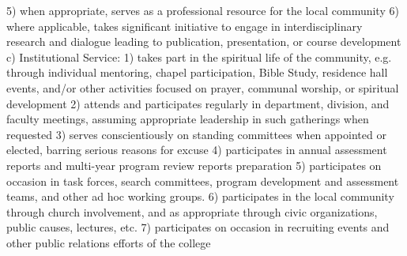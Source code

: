 \documentclass[letterpaper, 11pt]{article}
\begin{document}
5) when appropriate, serves as a professional resource for the local community
6) where applicable, takes significant initiative to engage in interdisciplinary research and dialogue leading to publication, presentation, or course development
c) Institutional Service:
1) takes part in the spiritual life of the community, e.g. through individual mentoring, chapel participation, Bible Study, residence hall events, and/or other activities focused on prayer, communal worship, or spiritual development
2) attends and participates regularly in department, division, and faculty meetings, assuming appropriate leadership in such gatherings when requested
3) serves conscientiously on standing committees when appointed or elected, barring serious reasons for excuse
4) participates in annual assessment reports and multi-year program review reports preparation
5) participates on occasion in task forces, search committees, program development and assessment teams, and other ad hoc working groups.
6) participates in the local community through church involvement, and as appropriate through civic organizations, public causes, lectures, etc.
7) participates on occasion in recruiting events and other public relations efforts of the college
\end{document}

